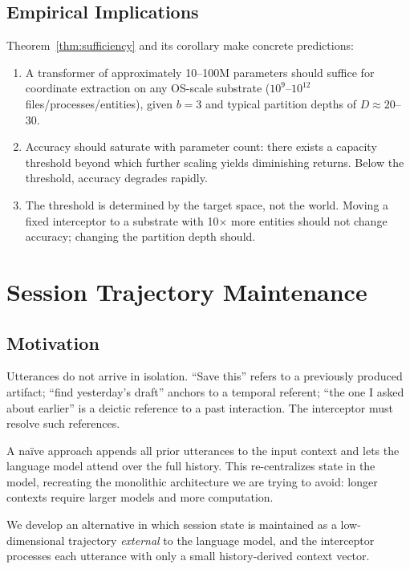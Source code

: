 \documentclass[11pt,a4paper]{article}
\theoremstyle{definition}
\theoremstyle{remark}
\begin{document}
\subsection{Empirical Implications}

Theorem~\ref{thm:sufficiency} and its corollary make concrete predictions:

\begin{enumerate}
    \item A transformer of approximately 10--100M parameters should suffice for coordinate extraction on any OS-scale substrate ($10^{9}$--$10^{12}$ files/processes/entities), given $b = 3$ and typical partition depths of $D \approx 20$--$30$.
    \item Accuracy should saturate with parameter count: there exists a capacity threshold beyond which further scaling yields diminishing returns. Below the threshold, accuracy degrades rapidly.
    \item The threshold is determined by the target space, not the world. Moving a fixed interceptor to a substrate with 10$\times$ more entities should not change accuracy; changing the partition depth should.
\end{enumerate}

\section{Session Trajectory Maintenance}
\label{sec:session}

\subsection{Motivation}

Utterances do not arrive in isolation. ``Save this'' refers to a previously produced artifact; ``find yesterday's draft'' anchors to a temporal referent; ``the one I asked about earlier'' is a deictic reference to a past interaction. The interceptor must resolve such references.

A na\"{i}ve approach appends all prior utterances to the input context and lets the language model attend over the full history. This re-centralizes state in the model, recreating the monolithic architecture we are trying to avoid: longer contexts require larger models and more computation.

We develop an alternative in which session state is maintained as a low-dimensional trajectory \emph{external} to the language model, and the interceptor processes each utterance with only a small history-derived context vector.
\end{document}
